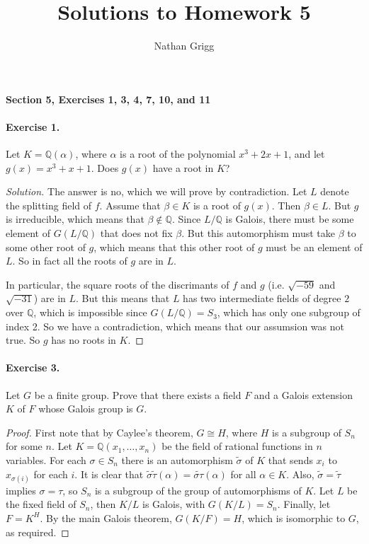\documentclass{article}
\title{Solutions to Homework 5}
\author{Nathan Grigg}
\date{}
\newcommand{\Q}{\mathbb Q}
\begin{document}
\maketitle
{\noindent\bf Section 5, Exercises 1, 3, 4, 7, 10, and 11}

\paragraph{Exercise 1.}  Let $K=\Q(\alpha)$, where $\alpha$ is a root of the polynomial $x^3+2x+1$, and let $g(x)=x^3+x+1$. Does $g(x)$ have a root in $K$?

\begin{proof}[Solution]
The answer is no, which we will prove by contradiction. 
Let $L$ denote the splitting field of $f$.
Assume that $\beta\in K$ is a root of $g(x)$. 
Then $\beta\in L$. But $g$ is irreducible, which means that
$\beta\not\in \Q$. Since $L/\Q$ is Galois, there must be some element
of $G(L/\Q)$ that does not fix $\beta$. But this automorphism must
take $\beta$ to some other root of $g$, which means that this other
root of $g$ must be an element of $L$. So in fact all the roots of $g$
are in $L$.

In particular, the square roots of the discrimants of $f$ and $g$
(i.e. $\sqrt{-59}$ and $\sqrt{-31}$) are in $L$. But this means that
$L$ has two intermediate fields of degree $2$ over $\Q$, which is
impossible since $G(L/\Q)=S_3$, which
 has only one subgroup of index 2. So we have a
contradiction, which means that our assumsion was not true. So $g$ has
no roots in $K$.
\end{proof}

\paragraph{Exercise 3.} Let $G$ be a finite group. Prove that there
exists a field $F$ and a Galois extension $K$ of $F$ whose Galois
group is $G$. 

\begin{proof}
First note that by Caylee's theorem, $G\cong H$, where $H$ is a subgroup
of $S_n$ for some $n$. Let $K=\Q(x_1,\ldots,x_n)$ be the field of rational
functions in $n$ variables. For each $\sigma\in S_n$ there is an
automorphism $\tilde \sigma$ of $K$ that sends $x_i$ to $x_{\sigma
  (i)}$ for each $i$. It is clear that $\tilde\sigma \tilde\tau
(\alpha ) = \widetilde{\sigma\tau}(\alpha)$ for all $\alpha\in
  K$. Also, $\tilde\sigma=\tilde\tau$ implies $\sigma=\tau$, 
so $S_n$ is a subgroup of the group of automorphisms of $K$. Let $L$
be the fixed field of $S_n$, then $K/L$ is Galois, with
$G(K/L)=S_n$. Finally, let $F=K^H$. By the main Galois theorem,
$G(K/F)=H$, which is isomorphic to $G$, as required.
\end{proof}
\end{document}
